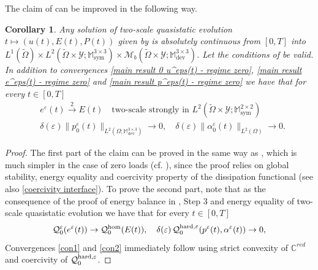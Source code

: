 \documentclass[reqno,10pt]{amsart}
\numberwithin{equation}{section}
\newtheorem{corollary}[theorem]{Corollary}
\theoremstyle{remark}
\newcommand{\C}{\mathbb{C}}
\newcommand{\M}{\mathbb{M}}
\newcommand{\calQ}{\mathcal{Q}}
\newcommand{\calY}{\mathcal{Y}}
\DeclareMathOperator{\dev}{dev}
\DeclareMathOperator{\sym}{sym}
\newcommand{\strongtwoscale}{\xrightarrow{\,2\,}}
\newcommand{\eps}{\varepsilon}
\newcommand{\Mb}{\mathcal{M}_b}
\newcommand{\ext}[1]{\widetilde{#1}}
\begin{document}
The claim of  can be improved in the following way.

\begin{corollary} \label{cor improved 2} 
Any solution of two-scale quasistatic evolution $t \mapsto (u(t), E(t), P(t))$ given by  is absolutely continuous from $[0,T]$ into $L^1(\ext{\Omega}) \times L^2(\ext{\Omega} \times \calY;\M^{3 \times 3}_{\sym}) \times \Mb(\ext{\Omega} \times \calY;\M^{3 \times 3}_{\dev})$. Let the conditions of  be valid. In addition to convergences \eqref{main result 0 u^eps(t) - regime zero}, \eqref{main result e^eps(t) - regime zero} and \eqref{main result p^eps(t) - regime zero} we have that for every $t \in [0,T]$
\begin{align} 
	& \label{con1} e^\eps(t) \strongtwoscale E(t) \quad \text{two-scale strongly in $L^2(\ext{\Omega} \times \calY;\M^{2 \times 2}_{\sym})$} \\ 
	& \label{con2} \delta(\eps) \|p_0^\eps(t)\|_{L^2(\Omega;\M^{3\times 3}_{\dev})} \to 0, \quad \delta(\eps) \|\alpha_0^\eps(t)\|_{L^2(\Omega)} \to 0. 
\end{align} 
\end{corollary}

\begin{proof} 
The first part of the claim can be proved in the same way as \cite[Theorem 5.2]{DalMaso.DeSimone.Mora.2006}, which is much simpler in the case of zero loads (cf. ), since the proof relies on global stability, energy equality and coercivity property of the dissipation functional (see also \eqref{coercivity interface}).
To prove the second part, note that as the consequence of the proof of energy balance in , Step 3 and energy equality of two-scale quasistatic evolution we have that for every $t \in [0,T]$
\[
	\calQ^{\eps}_{0}(e^\eps(t)) \to \calQ^{\rm hom}_{0}(E(t)), \quad \delta(\eps)\,\calQ^{\rm hard,\eps}_{0}(p^\eps(t), \alpha^\eps(t)) \to 0,
\]
Convergences \eqref{con1} and \eqref{con2} immediately follow using strict convexity of $\C^{red}$ and coercivity of $\calQ^{\rm hard,\eps}_{0}$.
\end{proof}
\end{document}
